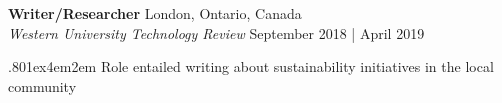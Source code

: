 \documentclass[a4paper,9pt]{extarticle}
\begin{document}
\noindent
\begin{minipage}{1\textwidth}
\setlength{\parindent}{15pt} %
	\noindent
	\textbf{Writer/Researcher} \hfill London, Ontario, Canada\\ %
	\textit{Western University Technology Review} \hfill September 2018 | April 2019 \par%
	{\hsize.80\linewidth\parskip1ex\hangindent4em\parindent2em 
	\setlength{\parskip}{0pt} %
		\indent Role entailed writing about sustainability initiatives in the local community \par}
\end{minipage}


    
\end{document}
